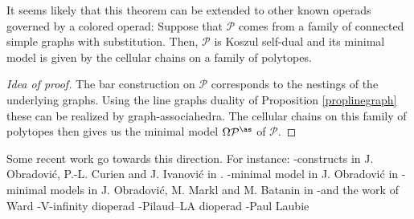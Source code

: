 It seems likely that this theorem can be extended to other known operads governed by a colored operad: Suppose that $\mathcal{P}$ comes from a family of connected simple graphs with substitution. Then, $\mathcal{P}$ is Koszul self-dual and its minimal model is given by the cellular chains on a family of polytopes. 
\begin{proof}[Idea of proof] The bar construction on $\mathcal{P}$ corresponds to the nestings of the underlying graphs. Using the line graphs duality of Proposition \ref{proplinegraph} these can be realized by graph-associahedra. The cellular chains on this family of polytopes then gives us the minimal model $\Omega \mathcal{P}^{\as}$ of $\mathcal{P}$.
\end{proof} 
Some recent work go towards this direction. For instance: 
-constructs in J. Obradovi\'c, P.-L. Curien and J. Ivanovi\'c in \cite{CIO18}.
-minimal model in  J. Obradovi\'c in \cite{Obradovic19} 
-minimal models in  J. Obradovi\'c, M. Markl and M. Batanin in \cite{BMO20}
-and the work of Ward
-V-infinity dioperad
-Pilaud--LA dioperad
-Paul Laubie



